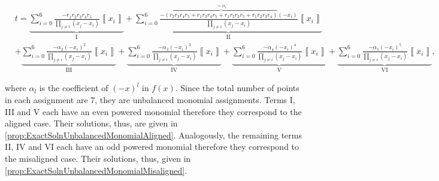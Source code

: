 \documentclass{theoretics}
\begin{document}
\begin{small}
  \begin{align*}
     & t  =\underbrace{\sum_{i=0}^{6}\frac{-r_{1}r_{2}r_{3}r_{4}r_{5}}{\prod_{j\neq i}(x_{j}-x_{i})}\left\llbracket x_{i}\right\rrbracket }_{\text{I}}+\underbrace{\sum_{i=0}^{6}\frac{-\overbrace{(r_{2}r_{3}r_{4}r_{5}+r_{1}r_{3}r_{4}r_{5}+r_{1}r_{2}r_{3}r_{5}+r_{1}r_{2}r_{3}r_{4})}^{:=\alpha_{1}}(-x_{i})}{\prod_{j\neq i}(x_{j}-x_{i})}\left\llbracket x_{i}\right\rrbracket }_{\text{II}}                                                                                                                                                                               \\
     & +\underbrace{\sum_{i=0}^{6}\frac{-\alpha_{2}(-x_{i})^{2}}{\prod_{j\neq i}(x_{j}-x_{i})}\left\llbracket x_{i}\right\rrbracket }_{\text{III}}+\underbrace{\sum_{i=0}^{6}\frac{-\alpha_{3}(-x_{i})^{3}}{\prod_{j\neq i}(x_{j}-x_{i})}\left\llbracket x_{i}\right\rrbracket }_{\text{IV}}+\underbrace{\sum_{i=0}^{6}\frac{-\alpha_{4}(-x_{i})^{4}}{\prod_{j\neq i}(x_{j}-x_{i})}\left\llbracket x_{i}\right\rrbracket }_{\text{V}}+\underbrace{\sum_{i=0}^{6}\frac{-\alpha_{5}(-x_{i})^{5}}{\prod_{j\neq i}(x_{j}-x_{i})}\left\llbracket x_{i}\right\rrbracket }_{\text{VI}},
  \end{align*}
\end{small}where $\alpha_{l}$ is the coefficient of $(-x)^{l}$ in $f(x)$.
Since the total number of points in each assignment are $7$, they
are unbalanced monomial assignments. Terms I, III and V each have
an even powered monomial therefore they correspond to the aligned
case. Their solutions, thus, are given in \cref{prop:ExactSolnUnbalancedMonomialAligned}.
Analogously, the remaining terms II, IV and VI each have an odd powered
monomial therefore they correspond to the misaligned case. Their solutions,
thus, given in \cref{prop:ExactSolnUnbalancedMonomialMisaligned}.
\end{document}
